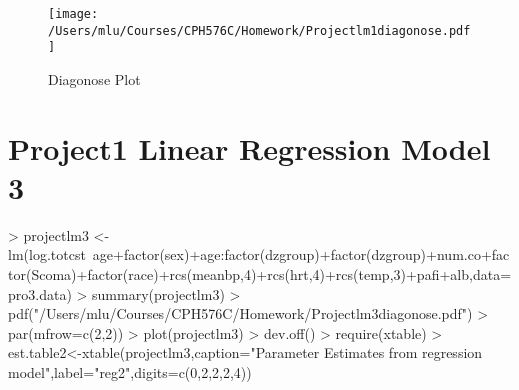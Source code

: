 \documentclass{article}
\begin{document}
 \begin{figure}[htb]
     \begin{center}
     \texttt{[image: /Users/mlu/Courses/CPH576C/Homework/Projectlm1diagonose.pdf]}
     \caption{Diagonose Plot }
     \end{center}
     \end{figure}
\section{Project1 Linear Regression Model 3}
\begin{Schunk}
\begin{Sinput}
> projectlm3 <- lm(log.totcst~age+factor(sex)+age:factor(dzgroup)+factor(dzgroup)+num.co+factor(Scoma)+factor(race)+rcs(meanbp,4)+rcs(hrt,4)+rcs(temp,3)+pafi+alb,data=pro3.data)
> summary(projectlm3)
> pdf("/Users/mlu/Courses/CPH576C/Homework/Projectlm3diagonose.pdf")
> par(mfrow=c(2,2))
> plot(projectlm3)
> dev.off()
> require(xtable)
> est.table2<-xtable(projectlm3,caption="Parameter Estimates from regression model",label="reg2",digits=c(0,2,2,2,4))
\end{Sinput}
\end{Schunk}
\end{document}
